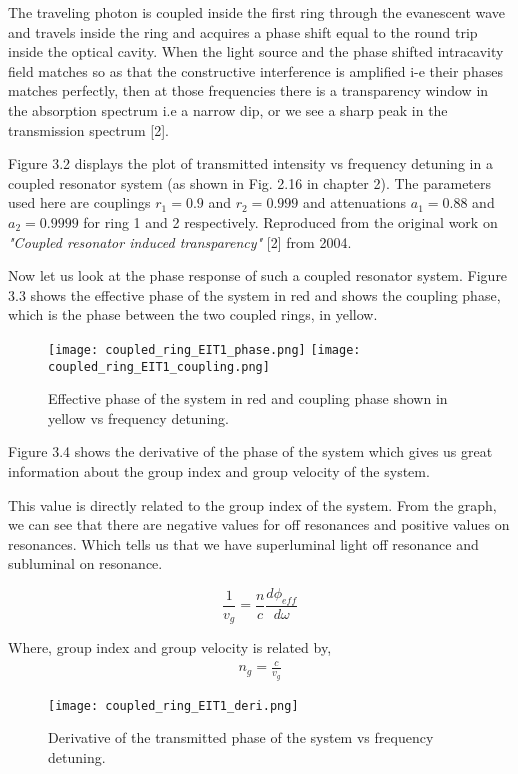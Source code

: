 The traveling photon is coupled inside the first ring through the evanescent wave and travels inside the ring and acquires a phase shift equal to the round trip inside the optical cavity. When the light source and the phase shifted intracavity field matches so as that the constructive interference is amplified i-e their phases matches perfectly, then at those frequencies there is a transparency window in the absorption spectrum i.e a narrow dip, or we see a sharp peak in the transmission spectrum [2].


Figure 3.2 displays the plot of transmitted intensity vs frequency detuning in a coupled resonator system (as shown in Fig. 2.16 in chapter 2). The parameters used here are couplings $r_{1} = 0.9$ and $r_{2} = 0.999$ and attenuations $a_{1} = 0.88$ and $a_{2} = 0.9999$ for ring 1 and 2 respectively. Reproduced from the original work on \textit{"Coupled resonator induced transparency"} [2] from 2004.


Now let us look at the phase response of such a coupled resonator system. Figure 3.3 shows the effective phase of the system in red and shows the coupling phase, which is the phase between the two coupled rings, in yellow. 

\begin{figure}[h]
\texttt{[image: coupled\_ring\_EIT1\_phase.png]}
\texttt{[image: coupled\_ring\_EIT1\_coupling.png]}
\caption{Effective phase of the system in red and coupling phase shown in yellow vs frequency detuning.}
\end{figure}

Figure 3.4 shows the derivative of the phase of the system which gives us great information about the group index and group velocity of the system. 

This value is directly related to the group index of the system. From the graph, we can see that there are negative values for off resonances and positive values on resonances. Which tells us that we have superluminal light off resonance and subluminal on resonance. 

\begin{equation}
\frac{1}{v_{g}} = \frac{n}{c} \frac{d\phi_{eff}}{d\omega}
\end{equation}

Where, group index and group velocity is related by, 
\begin{align*}
n_{g} = \frac{c}{v_{g}}
\end{align*}

\begin{figure}[h]
\centering
\texttt{[image: coupled\_ring\_EIT1\_deri.png]}
\caption{Derivative of the transmitted phase of the system vs frequency detuning.}
\end{figure}

